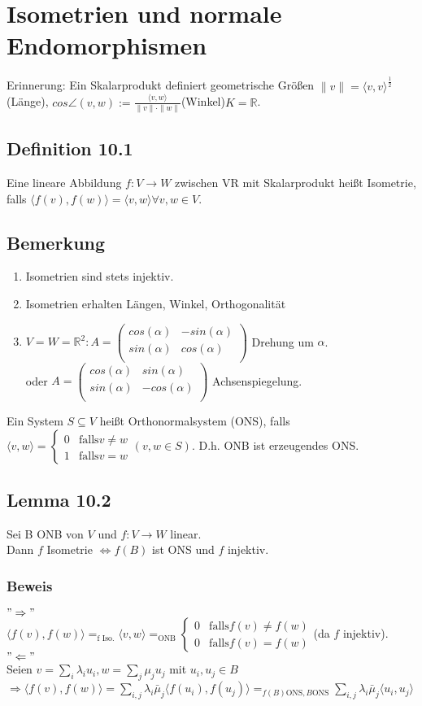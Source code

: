 \documentclass[a4paper, 12pt]{extarticle}
\newcommand{\twopartdef}[4] {
	\left\{
		\begin{array}{ll}
			#1 & #2 \\
			#3 & #4
		\end{array}
	\right.
}
\newcommand{\norm}[1]{
	\parallel #1 \parallel
}
\newcommand{\skalar}[2] {
	\langle #1, #2\rangle
}
\begin{document}
\section{Isometrien und normale Endomorphismen}
Erinnerung: Ein Skalarprodukt definiert geometrische Größen
$\norm{v} = \skalar{v}{v}^{\frac{1}{2}}$(Länge), $cos\angle(v,w) := \frac{\skalar{v}{w}}{\norm{v}\cdot \norm{w}}$(Winkel)$K = \mathbb{R}$.
\subsection*{Definition 10.1}
Eine lineare Abbildung $f: V \longrightarrow W$ zwischen VR mit Skalarprodukt heißt Isometrie, falls $\skalar{f(v)}{f(w)} = \skalar{v}{w} \forall v,w \in V$.\\
\subsection*{Bemerkung}
\begin{enumerate}[label = \alph*)]
	\item Isometrien sind stets injektiv.
	\item Isometrien erhalten Längen, Winkel, Orthogonalität
	\item $V = W = \mathbb{R}^2: A = \left( \begin{matrix}
		cos(\alpha) & -sin(\alpha) \\
		sin(\alpha) & cos(\alpha) \\
	\end{matrix}\right)$ Drehung um $\alpha$.\\
	oder $A = \left( \begin{matrix}
		cos(\alpha) & sin(\alpha) \\
		sin(\alpha) & -cos(\alpha) \\
	\end{matrix}\right)$ Achsenspiegelung.
\end{enumerate}
Ein System $S\subseteq V$ heißt Orthonormalsystem (ONS), falls $\skalar{v}{w} = \twopartdef{0}{\text{falls} v \neq w}{1}{\text{falls} v = w} (v,w\in S).$ D.h. ONB ist erzeugendes ONS.
\subsection*{Lemma 10.2}
Sei B ONB von $V$ und $f: V \longrightarrow W$ linear.\\
Dann $f$ Isometrie $\Leftrightarrow f(B)$ ist ONS und $f$ injektiv.
\subsubsection*{Beweis}
$"\Rightarrow"$\\
$\skalar{f(v)}{f(w)} =_{\text{f Iso.}} \skalar{v}{w} =_{\text{ONB}}  \twopartdef{0}{\text{falls} f(v) \neq f(w)}{0}{\text{falls} f(v) = f(w)}$(da $f$ injektiv).\\
$"\Leftarrow"$\\
Seien $v = \sum_{i}\lambda_i u_i, w= \sum_{j} \mu_j u_j$ mit $u_i, u_j \in B$\\
$\Rightarrow \skalar{f(v)}{f(w)} = \sum_{i, j} \lambda_i\bar\mu_j \skalar{f(u_i)}{f(u_j)} =_{f(B)\text{ONS}, B \text{ONS}} \sum_{i,j}\lambda_i\bar\mu_j \skalar{u_i}{u_j}$
\end{document}
